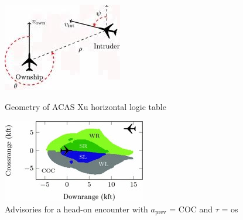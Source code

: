 \begin{figure}[ht]
    \centering
    \begin{minipage}[b]{0.45\linewidth}
        \includegraphics[width=\linewidth]{Figures/acasxu_geometry.jpg}
        \caption{Geometry of ACAS Xu horizontal logic table \cite{katz2017reluplex}}
        \label{fig:acasxu-geometry}
    \end{minipage}
    \hfill
    \begin{minipage}[b]{0.45\linewidth}
        \includegraphics[width=\linewidth]{Figures/acasxu_advisories.jpg}
        \caption{Advisories for a head-on encounter with \(a_{\text{prev}}\) = COC and \(\tau\) = os \cite{katz2017reluplex}}
        \label{fig:acasxu-advisories}
    \end{minipage}
\end{figure}

